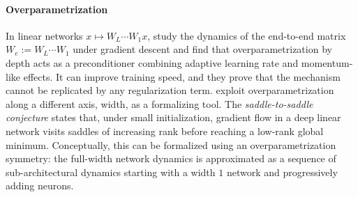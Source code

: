 \documentclass[mathematics,review,submit,moreauthors]{Definitions/mdpi}
\begin{document}
\paragraph{Overparametrization}
In linear networks $x\mapsto W_L\cdots W_1x$, \citet{arora2018p3icml} study the dynamics of the end-to-end matrix $W_e:=W_L\cdots W_1$ under gradient descent and find that overparametrization by depth acts as a preconditioner combining adaptive learning rate and momentum-like effects.
It can improve training speed, and they prove that the mechanism cannot be replicated by any regularization term.
\citet{jacot2022} exploit overparametrization along a different axis, width, as a formalizing tool.
The \emph{saddle-to-saddle conjecture} states that, under small initialization, gradient flow in a deep linear network visits saddles of increasing rank before reaching a low-rank global minimum.
Conceptually, this can be formalized using an overparametrization symmetry: the full-width network dynamics is approximated as a sequence of sub-architectural dynamics starting with a width $1$ network and progressively adding neurons.
\end{document}
